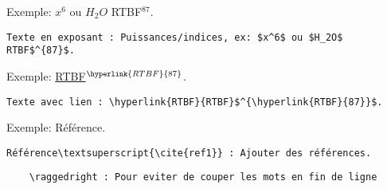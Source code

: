 Exemple: $x^6$ ou $H_2O$ RTBF$^{87}$.
\begin{verbatim}
Texte en exposant : Puissances/indices, ex: $x^6$ ou $H_2O$ RTBF$^{87}$.
\end{verbatim}

Exemple: \hyperlink{RTBF}{RTBF}$^{\hyperlink{RTBF}{87}}$.
\begin{verbatim}
Texte avec lien : \hyperlink{RTBF}{RTBF}$^{\hyperlink{RTBF}{87}}$.
\end{verbatim}

Exemple: Référence\textsuperscript{\cite{ref1}}.
\begin{verbatim}
Référence\textsuperscript{\cite{ref1}} : Ajouter des références.
\end{verbatim}

\begin{verbatim}
    \raggedright : Pour eviter de couper les mots en fin de ligne
\end{verbatim}





